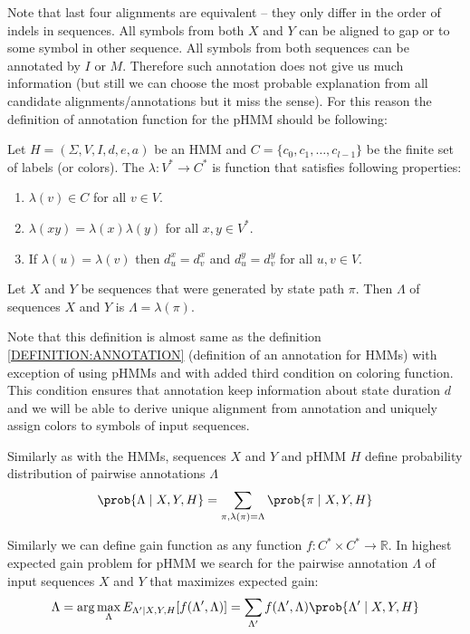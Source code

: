Note that last four  alignments are equivalent -- they only differ in the order
of indels in sequences. All symbols from both $X$ and $Y$ can be aligned to gap
or to some symbol in other sequence. All symbols from both sequences can be
annotated by $I$ or $M$. Therefore such annotation does not give us much
information (but still we can choose the most probable explanation from all
candidate alignments/annotations but it miss the sense).
For this reason the definition of annotation function for the pHMM
should be following:

\begin{definition}
Let $H=(\Sigma,V,I,d,e,a)$ be an HMM and $C=\{c_0,c_1,\dots,c_{l-1}\}$ be the
finite set of labels (or colors). The 
$\lambda:V^*\to C^*$ is function that satisfies following properties: 
\begin{enumerate}
\item $\lambda(v)\in C$ for all $v\in V$.
\item $\lambda(xy) = \lambda(x)\lambda(y)$ for all $x,y\in V^*$.
\item If $\lambda(u)=\lambda(v)$ then $d^x_u=d^x_v$ and $d^y_u=d^y_v$ for all
$u,v\in V$.
\end{enumerate}
Let $X$ and $Y$ be sequences that were generated by state path $\pi$. Then
 $\Lambda$ of sequences $X$ and $Y$ is 
$\Lambda=\lambda(\pi)$.
\end{definition}

Note that this definition is almost same as the definition
\ref{DEFINITION:ANNOTATION} (definition of an annotation for HMMs) with exception of using pHMMs and with added 
third condition on coloring function. This condition ensures that 
annotation keep information about state duration $d$ and we will
be able to derive unique alignment from annotation and uniquely assign
colors to symbols of input sequences.

Similarly as with the HMMs, sequences $X$ and $Y$ and pHMM $H$ define
probability distribution of pairwise annotations $\Lambda$
\[\prob{\Lambda\mid X,Y,H} = \sum_{\pi,\lambda(\pi)=\Lambda}\prob{\pi\mid
X,Y,H}\]

Similarly we can define gain function as any function $f:C^*\times C^*\to
\mathbb{R}$. In highest expected gain problem for pHMM we search for
the pairwise annotation $\Lambda$ of input sequences $X$ and $Y$ that maximizes
expected gain:
\[\Lambda = \arg\max_{\Lambda} E_{\Lambda'\mid X,Y,H}[f(\Lambda',\Lambda)]
=  \sum_{\Lambda'}f(\Lambda',\Lambda)\prob{\Lambda'\mid X,Y,H}\]

